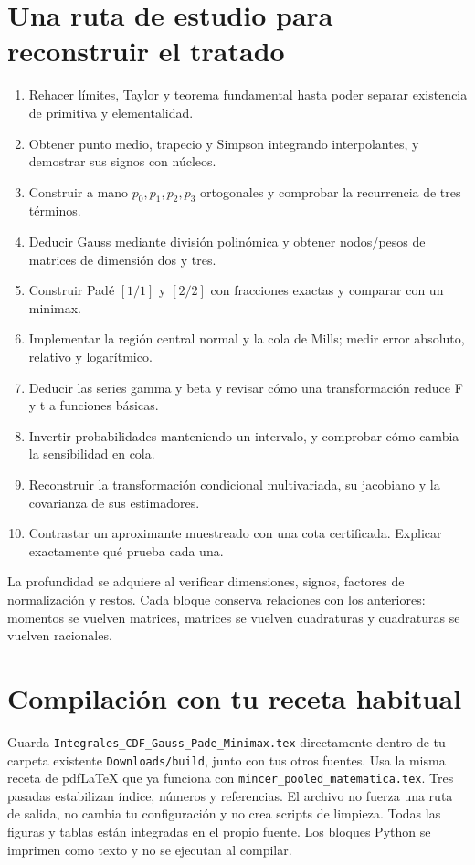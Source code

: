 \documentclass[11pt,a4paper]{article}
\theoremstyle{definition}
\begin{document}
\section{Una ruta de estudio para reconstruir el tratado}
\begin{enumerate}
\item Rehacer límites, Taylor y teorema fundamental hasta poder separar existencia de primitiva y elementalidad.
\item Obtener punto medio, trapecio y Simpson integrando interpolantes, y demostrar sus signos con núcleos.
\item Construir a mano $p_0,p_1,p_2,p_3$ ortogonales y comprobar la recurrencia de tres términos.
\item Deducir Gauss mediante división polinómica y obtener nodos/pesos de matrices de dimensión dos y tres.
\item Construir Padé $[1/1]$ y $[2/2]$ con fracciones exactas y comparar con un minimax.
\item Implementar la región central normal y la cola de Mills; medir error absoluto, relativo y logarítmico.
\item Deducir las series gamma y beta y revisar cómo una transformación reduce F y t a funciones básicas.
\item Invertir probabilidades manteniendo un intervalo, y comprobar cómo cambia la sensibilidad en cola.
\item Reconstruir la transformación condicional multivariada, su jacobiano y la covarianza de sus estimadores.
\item Contrastar un aproximante muestreado con una cota certificada. Explicar exactamente qué prueba cada una.
\end{enumerate}
La profundidad se adquiere al verificar dimensiones, signos, factores de normalización y restos. Cada bloque conserva relaciones con los anteriores: momentos se vuelven matrices, matrices se vuelven cuadraturas y cuadraturas se vuelven racionales.

\section{Compilación con tu receta habitual}
Guarda \texttt{Integrales\_CDF\_Gauss\_Pade\_Minimax.tex} directamente dentro de tu carpeta existente \texttt{Downloads/build}, junto con tus otros fuentes. Usa la misma receta de pdfLaTeX que ya funciona con \texttt{mincer\_pooled\_matematica.tex}. Tres pasadas estabilizan índice, números y referencias.
El archivo no fuerza una ruta de salida, no cambia tu configuración y no crea scripts de limpieza. Todas las figuras y tablas están integradas en el propio fuente. Los bloques Python se imprimen como texto y no se ejecutan al compilar.


\label{ultima-pagina}
\end{document}
